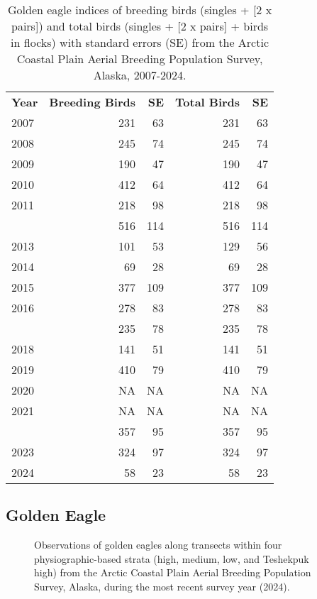 \documentclass[
]{article}
\begin{document}
\begin{longtable}[t]{lrrrr}

\caption{\label{tbl-GOEA}Golden eagle indices of breeding birds (singles
+ {[}2 x pairs{]}) and total birds (singles + {[}2 x pairs{]} + birds in
flocks) with standard errors (SE) from the Arctic Coastal Plain Aerial
Breeding Population Survey, Alaska, 2007-2024.}

\tabularnewline

\\
\toprule
\textbf{Year} & \textbf{Breeding Birds} & \textbf{SE} & \textbf{Total Birds} & \textbf{SE}\\
\midrule
2007 & 231 & 63 & 231 & 63\\
2008 & 245 & 74 & 245 & 74\\
2009 & 190 & 47 & 190 & 47\\
2010 & 412 & 64 & 412 & 64\\
2011 & 218 & 98 & 218 & 98\\
\addlinespace
2012 & 516 & 114 & 516 & 114\\
2013 & 101 & 53 & 129 & 56\\
2014 & 69 & 28 & 69 & 28\\
2015 & 377 & 109 & 377 & 109\\
2016 & 278 & 83 & 278 & 83\\
\addlinespace
2017 & 235 & 78 & 235 & 78\\
2018 & 141 & 51 & 141 & 51\\
2019 & 410 & 79 & 410 & 79\\
2020 & NA & NA & NA & NA\\
2021 & NA & NA & NA & NA\\
\addlinespace
2022 & 357 & 95 & 357 & 95\\
2023 & 324 & 97 & 324 & 97\\
2024 & 58 & 23 & 58 & 23\\
\bottomrule

\end{longtable}

\endgroup{}

\newpage{}

\subsection*{Golden Eagle}\label{golden-eagle-2}

\begin{figure}


\caption{\label{fig-GOEAmap}Observations of golden eagles along
transects within four physiographic-based strata (high, medium, low, and
Teshekpuk high) from the Arctic Coastal Plain Aerial Breeding Population
Survey, Alaska, during the most recent survey year (2024).}

\end{figure}%
\end{document}
